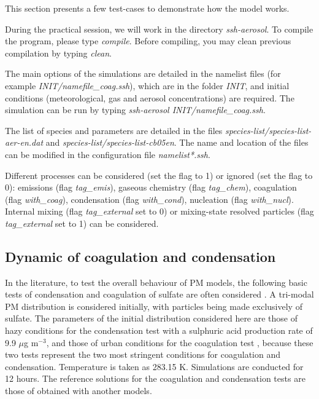 \documentclass[a4paper,11pt]{article}
\begin{document}
This section presents a few test-cases to demonstrate how the model works.

During the practical session, we will work in the directory
{\textit{ssh-aerosol}}. 
To compile the program, please type {\it{compile}}. Before compiling, you may
clean previous compilation by typing {\it{clean}}.

The main options of the simulations are detailed in the namelist files (for
example {\it{INIT/namefile\_coag.ssh}}), which are in the folder {\it{INIT}}, and
initial conditions (meteorological, gas and aerosol concentrations) are
required.
The simulation can be run by typing {\it{ssh-aerosol INIT/namefile\_coag.ssh}}.

The list of species and parameters are detailed in the files {\it{species-list/species-list-aer-en.dat}} and {\it{species-list/species-list-cb05en}}. The name and location of the files can be modified in the configuration file {\it{namelist*.ssh}}.

Different processes can be considered (set the flag to 1) or ignored (set the flag to 0): emissions (flag {\it{tag\_emis}}),
gaseous chemistry (flag {\it{tag\_chem}}),
coagulation (flag {\it{with\_coag}}),
condensation (flag {\it{with\_cond}}),
nucleation (flag {\it{with\_nucl}}).
Internal mixing (flag {\it{tag\_external}} set to 0) or mixing-state resolved particles (flag {\it{tag\_external}} set to 1) can be considered. 

\subsection{Dynamic of coagulation and condensation}

In the literature, to test the overall behaviour of PM models, the following 
basic tests of
condensation and coagulation of sulfate are often considered \cite{seigneur1986simulation,zhang1999simulation,binkowski2003models}. A tri-modal PM distribution is considered initially,
with particles being made exclusively of sulfate. The parameters of the initial distribution
considered here are those of hazy conditions for the condensation test with a sulphuric
acid production rate of 9.9 $\mu$g m$^{-3}$, and those of urban conditions for the coagulation test \cite{seigneur1986simulation,zhang1999simulation} , because these two tests represent the two most
stringent conditions for coagulation and condensation. Temperature is taken as 283.15 K.
Simulations are conducted for 12 hours.
The reference solutions for the coagulation and condensation tests are those of \cite{zhang1999simulation} obtained with another models.
\end{document}
